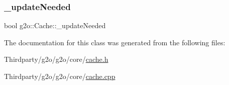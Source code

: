 \subsubsection{\texorpdfstring{\+\_\+update\+Needed}{\_updateNeeded}}
{\footnotesize\ttfamily bool g2o\+::\+Cache\+::\+\_\+update\+Needed\hspace{0.3cm}{\ttfamily [protected]}}



The documentation for this class was generated from the following files\+:\begin{DoxyCompactItemize}
\item 
Thirdparty/g2o/g2o/core/\mbox{\hyperlink{cache_8h}{cache.\+h}}\item 
Thirdparty/g2o/g2o/core/\mbox{\hyperlink{cache_8cpp}{cache.\+cpp}}\end{DoxyCompactItemize}
